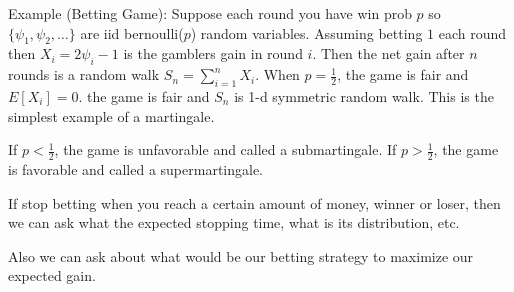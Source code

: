 \documentclass[answers,12pt,addpoints]{exam}
\begin{document}
\begin{definition}[Martingale]
    Example (Betting Game): Suppose each round you have win prob $p$ so $\{ \psi_1, \psi_2, \ldots \}$ are iid bernoulli($p$) random variables. Assuming betting $1$  each round then $X_i = 2\psi_i - 1$ is the gamblers gain in round $i$. Then the net gain after $n$ rounds is a random walk $S_n = \sum_{i=1}^{n} X_i$. When $p = \frac{1}{2}$, the game is fair and $E[X_i] = 0$. the game is fair and $S_n$ is 1-d symmetric random walk. This is the simplest example of a martingale.
    
    If $p < \frac{1}{2}$, the game is unfavorable and called a submartingale. If $p > \frac{1}{2}$, the game is favorable and called a supermartingale.

    If stop betting when you reach a certain amount of money, winner or loser, then we can ask what the expected stopping time, what is its distribution, etc.

    Also we can ask about what would be our betting strategy to maximize our expected gain.
\end{definition}
\end{document}

